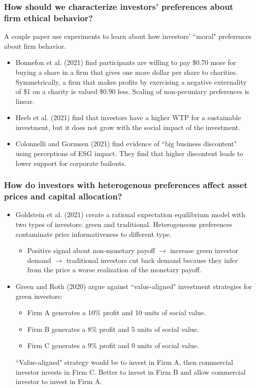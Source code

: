 \documentclass[handout]{beamer}
\begin{document}
\begin{frame}
\frametitle{How should we characterize investors' preferences about firm ethical behavior?}
A couple paper use experiments to learn about how investors' ``moral" preferences about firm behavior.
\bigskip
\begin{itemize}[<+->]
\item Bonnefon et al. (2021) find participants are willing to pay \$0.70 more for buying a share in a firm that gives one more dollar per share to charities. Symmetrically, a firm that makes profits by exercising a negative externality of \$1 on a charity is valued \$0.90 less. Scaling of non-pecuniary preferences is linear.
\bigskip
\item Heeb et al. (2021) find that investors have a higher WTP for a sustainable investment, but it does not grow with the social impact of the investment.
\bigskip
\item Colonnelli and Gormsen (2021) find evidence of ``big business discontent" using perceptions of ESG impact.  They find that higher discontent leads to lower support for corporate bailouts.
\end{itemize}
\end{frame}


\begin{frame}
\frametitle{How do investors with heterogenous preferences affect asset prices and capital allocation?}
\bigskip
\begin{itemize}[<+->]
\item Goldstein et al. (2021) create a rational expectation equilibrium model with two types of investors: green and traditional. Heterogeneous preferences contaminate price informativeness to different type.  
\begin{itemize}
\item Positive signal about non-monetary payoff $\rightarrow$ increase green investor demand $\rightarrow$ traditional investors cut back demand because they infer from  the price a worse realization of the monetary payoff.
\end{itemize}
\bigskip
\item Green and Roth (2020) argue against ``value-aligned" investment strategies for green investors:
\begin{itemize}
\item Firm A generates a 10\% profit and 10 units of social value.
\item Firm B generates a 8\% profit and 5 units of social value.
\item Firm C generates a 9\% profit and 0 units of social value.
\end{itemize}
``Value-aligned" strategy would be to invest in Firm A, then commercial investor invests in Firm C. Better to invest in Firm B and allow commercial investor to invest in Firm A.
\end{itemize}
\end{frame}
\end{document}
